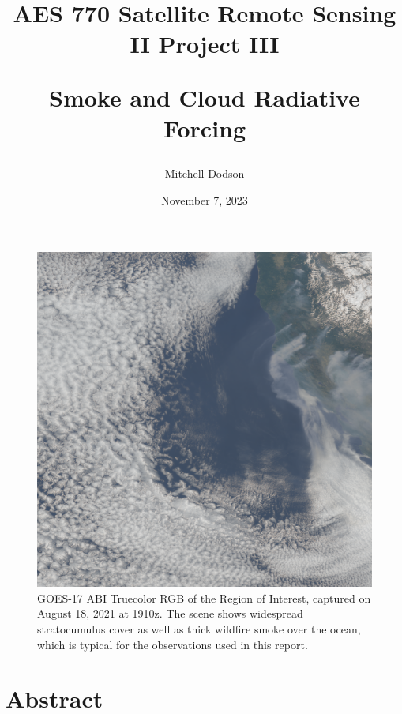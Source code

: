 \documentclass[12pt]{article}
\title{\vspace{-3em}AES 770 Satellite Remote Sensing II Project III

Smoke and Cloud Radiative Forcing}
\author{Mitchell Dodson}
\date{November 7, 2023}
\begin{document}
\maketitle

\vspace{-2em}

\begin{figure}[h!]
    \centering
    \includegraphics[width=.5\paperwidth]{figs/cover.png}
    \caption{GOES-17 ABI Truecolor RGB of the Region of Interest, captured on August 18, 2021 at 1910z. The scene shows widespread stratocumulus cover as well as thick wildfire smoke over the ocean, which is typical for the observations used in this report.}
    \label{cover}
\end{figure}

\vspace{-1em}

\section{Abstract}
\end{document}
